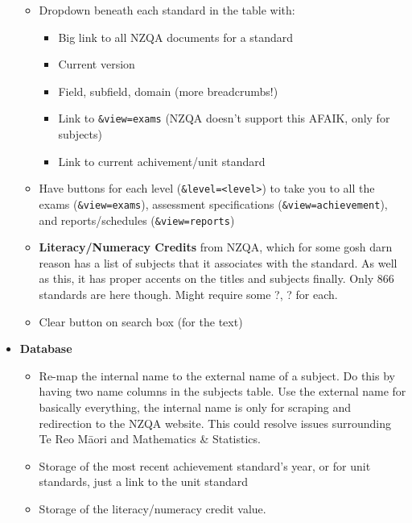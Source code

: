 \documentclass{article}
\begin{document}
\begin{itemize}
\begin{itemize}
        \item Dropdown beneath each standard in the table with:
        \begin{itemize}
            \item Big link to all NZQA documents for a standard
            \item Current version
            \item Field, subfield, domain (more breadcrumbs!)
            \item Link to \texttt{\&view=exams} (NZQA doesn't support this AFAIK, only for subjects)
            \item Link to current achivement/unit standard
        \end{itemize}
        \item Have buttons for each level (\texttt{\&level=<level>}) to take you to all the exams (\texttt{\&view=exams}), assessment specifications (\texttt{\&view=achievement}), and reports/schedules (\texttt{\&view=reports})
        \item \textbf{Literacy/Numeracy Credits} from NZQA, which for some gosh darn reason has a list of subjects that it associates with the standard. As well as this, it has proper accents on the titles and subjects finally. Only 866 standards are here though. Might require some ?, ? for each.
        \item Clear button on search box (for the text)
    \end{itemize}
    \item \textbf{Database}
    \begin{itemize}
        \item Re-map the internal name to the external name of a subject. Do this by having two name columns in the subjects table. Use the external name for basically everything, the internal name is only for scraping and redirection to the NZQA website. This could resolve issues surrounding  Te Reo M\={a}ori and Mathematics \& Statistics.
        \item Storage of the most recent achievement standard's year, or for unit standards, just a link to the unit standard
        \item Storage of the literacy/numeracy credit value.
    \end{itemize}
\end{itemize}
\end{document}
